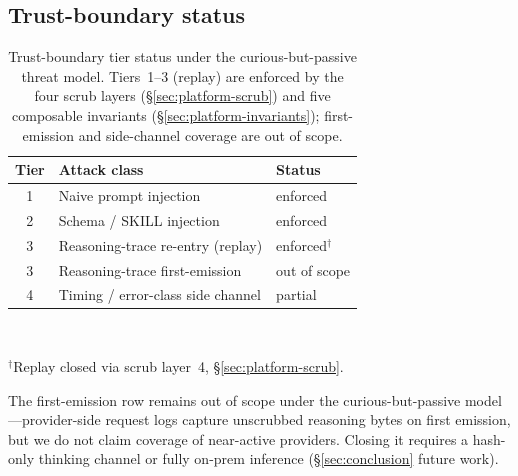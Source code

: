 \subsection{Trust-boundary status}
\label{sec:platform-status}

\begin{table}[t]
  \centering
  \caption{Trust-boundary tier status under the
    curious-but-passive threat model. Tiers~1--3 (replay) are
    enforced by the four scrub layers
    (\S\ref{sec:platform-scrub}) and five composable invariants
    (\S\ref{sec:platform-invariants}); first-emission and
    side-channel coverage are out of scope.}
  \label{tab:tiers}
  \footnotesize
  \begin{tabular}{c l l}
    \toprule
    \textbf{Tier} & \textbf{Attack class} & \textbf{Status} \\
    \midrule
    1 & Naive prompt injection            & enforced \\
    2 & Schema / SKILL injection          & enforced \\
    3 & Reasoning-trace re-entry (replay) & enforced$^{\dagger}$ \\
    3 & Reasoning-trace first-emission    & out of scope \\
    4 & Timing / error-class side channel & partial \\
    \bottomrule
  \end{tabular}
  \\[0.3em]
  \begin{minipage}{0.95\linewidth}\footnotesize
  $^{\dagger}$Replay closed via scrub layer~4,
  \S\ref{sec:platform-scrub}.
  \end{minipage}
\end{table}

The first-emission row remains out of scope under the
curious-but-passive model---provider-side request logs capture
unscrubbed reasoning bytes on first emission, but we do not claim
coverage of near-active providers. Closing it requires a hash-only
thinking channel or fully on-prem inference
(\S\ref{sec:conclusion} future work).

